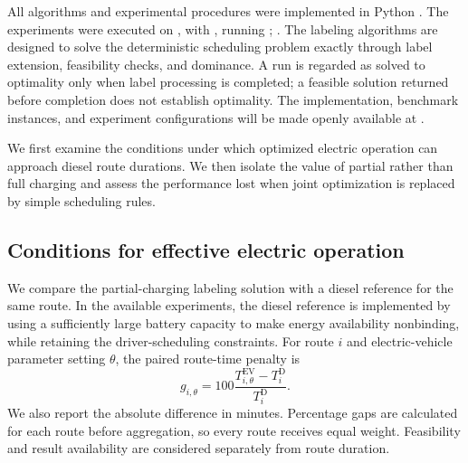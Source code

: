 \documentclass[3p,11pt,authoryear]{elsarticle}  %
\begin{document}
All algorithms and experimental procedures were implemented in Python . The experiments were executed on , with , running ; . The labeling algorithms are designed to solve the deterministic scheduling problem exactly through label extension, feasibility checks, and dominance. A run is regarded as solved to optimality only when label processing is completed; a feasible solution returned before completion does not establish optimality. 
The implementation, benchmark instances, and experiment configurations will be made openly available at .

We first examine the conditions under which optimized electric operation can approach diesel route durations. We then isolate the value of partial rather than full charging and assess the performance lost when joint optimization is replaced by simple scheduling rules.

\subsection{Conditions for effective electric operation}
\label{sec:results_conditions}

We compare the partial-charging labeling solution with a diesel reference for the same route. In the available experiments, the diesel reference is implemented by using a sufficiently large battery capacity to make energy availability nonbinding, while retaining the driver-scheduling constraints. For route $i$ and electric-vehicle parameter setting $\theta$, the paired route-time penalty is
\begin{equation}
    g_{i,\theta}=100\frac{T^{\mathrm{EV}}_{i,\theta}-T^{\mathrm{D}}_i}{T^{\mathrm{D}}_i}.
    \label{eq:conditions_gap}
\end{equation}
We also report the absolute difference in minutes. Percentage gaps are calculated for each route before aggregation, so every route receives equal weight. Feasibility and result availability are considered separately from route duration.
\end{document}
